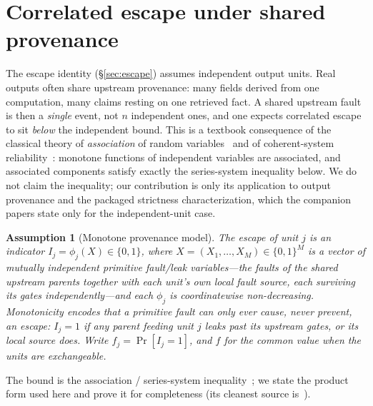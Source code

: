 \documentclass[11pt]{article}
\newtheorem{assumption}{Assumption}
\theoremstyle{definition}
\theoremstyle{remark}
\newcommand{\fesc}{f}
\begin{document}
\section{Correlated escape under shared provenance}\label{sec:corr}
The escape identity (\S\ref{sec:escape}) assumes independent output units. Real outputs often share
upstream provenance: many fields derived from one computation, many claims resting on one retrieved
fact. A shared upstream fault is then a \emph{single} event, not $n$ independent ones, and one expects
correlated escape to sit \emph{below} the independent bound. This is a textbook consequence of the
classical theory of \emph{association} of random variables~\cite{esary1967} and of coherent-system
reliability~\cite{barlowproschan1965}: monotone functions of independent variables are associated, and
associated components satisfy exactly the series-system inequality below. We do not claim the
inequality; our contribution is only its application to output provenance and the packaged strictness
characterization, which the companion papers state only for the independent-unit case.

\begin{assumption}[Monotone provenance model]\label{ass:prov}
The escape of unit $j$ is an indicator $I_j=\phi_j(X)\in\{0,1\}$, where
$X=(X_1,\dots,X_M)\in\{0,1\}^M$ is a vector of \emph{mutually independent} primitive fault/leak
variables---the faults of the shared upstream parents together with each unit's own local fault
source, each surviving its gates independently---and each $\phi_j$ is coordinatewise non-decreasing.
Monotonicity encodes that a primitive fault can only ever cause, never prevent, an escape: $I_j=1$
if any parent feeding unit $j$ leaks past its upstream gates, or its local source does. Write
$\fesc_j=\Pr[I_j=1]$, and $\fesc$ for the common value when the units are exchangeable.
\end{assumption}

The bound is the association / series-system inequality~\cite{esary1967,barlowproschan1965}; we state
the product form used here and prove it for completeness (its cleanest source is~\cite{esary1967}).
\end{document}
